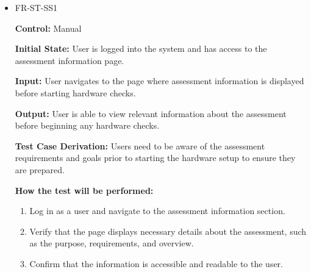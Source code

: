 \documentclass[12pt, titlepage]{article}
\begin{document}
\begin{itemize}
  \item FR-ST-SS1
    \begin{mdframed}[linewidth=0.5mm]
      \textbf{Control:} Manual \par
      \textbf{Initial State:} User is logged into the system and has access to the assessment information page. \par
      \textbf{Input:} User navigates to the page where assessment information is displayed before starting hardware checks. \par
      \textbf{Output:} User is able to view relevant information about the assessment before beginning any hardware checks. \par
      \textbf{Test Case Derivation:} Users need to be aware of the assessment requirements and goals prior to starting the hardware setup to ensure they are prepared. \par
      \textbf{How the test will be performed:}
      \begin{enumerate}[noitemsep]
        \item Log in as a user and navigate to the assessment information section.
        \item Verify that the page displays necessary details about the assessment, such as the purpose, requirements, and overview.
        \item Confirm that the information is accessible and readable to the user.
      \end{enumerate}
    \end{mdframed}


\end{itemize}
\end{document}

